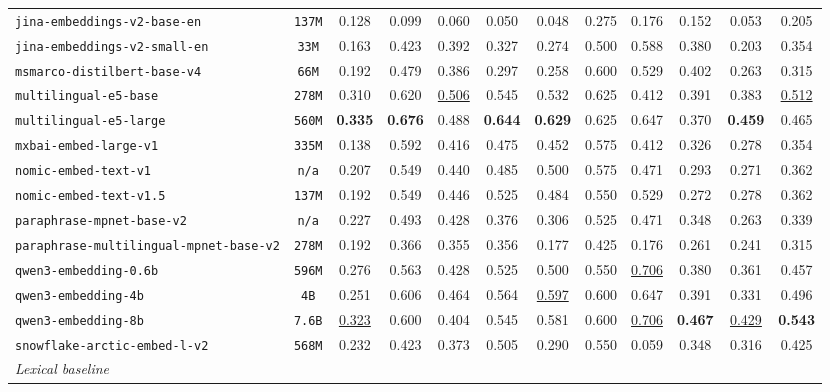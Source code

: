 \documentclass{article}
\begin{document}
\begin{table}[htbp]
{\begin{tabular}{lccccccccccc}
\texttt{jina-embeddings-v2-base-en} & \texttt{137M} & 0.128 & 0.099 & 0.060 & 0.050 & 0.048 & 0.275 & 0.176 & 0.152 & 0.053 & 0.205 \\
\texttt{jina-embeddings-v2-small-en} & \texttt{33M} & 0.163 & 0.423 & 0.392 & 0.327 & 0.274 & 0.500 & 0.588 & 0.380 & 0.203 & 0.354 \\
\texttt{msmarco-distilbert-base-v4} & \texttt{66M} & 0.192 & 0.479 & 0.386 & 0.297 & 0.258 & 0.600 & 0.529 & 0.402 & 0.263 & 0.315 \\
\texttt{multilingual-e5-base} & \texttt{278M} & 0.310 & 0.620 & \underline{0.506} & 0.545 & 0.532 & 0.625 & 0.412 & 0.391 & 0.383 & \underline{0.512} \\
\texttt{multilingual-e5-large} & \texttt{560M} & \textbf{0.335} & \textbf{0.676} & 0.488 & \textbf{0.644} & \textbf{0.629} & 0.625 & 0.647 & 0.370 & \textbf{0.459} & 0.465 \\
\texttt{mxbai-embed-large-v1} & \texttt{335M} & 0.138 & 0.592 & 0.416 & 0.475 & 0.452 & 0.575 & 0.412 & 0.326 & 0.278 & 0.354 \\
\texttt{nomic-embed-text-v1} & \texttt{n/a} & 0.207 & 0.549 & 0.440 & 0.485 & 0.500 & 0.575 & 0.471 & 0.293 & 0.271 & 0.362 \\
\texttt{nomic-embed-text-v1.5} & \texttt{137M} & 0.192 & 0.549 & 0.446 & 0.525 & 0.484 & 0.550 & 0.529 & 0.272 & 0.278 & 0.362 \\
\texttt{paraphrase-mpnet-base-v2} & \texttt{n/a} & 0.227 & 0.493 & 0.428 & 0.376 & 0.306 & 0.525 & 0.471 & 0.348 & 0.263 & 0.339 \\
\texttt{paraphrase-multilingual-mpnet-base-v2} & \texttt{278M} & 0.192 & 0.366 & 0.355 & 0.356 & 0.177 & 0.425 & 0.176 & 0.261 & 0.241 & 0.315 \\
\texttt{qwen3-embedding-0.6b} & \texttt{596M} & 0.276 & 0.563 & 0.428 & 0.525 & 0.500 & 0.550 & \underline{0.706} & 0.380 & 0.361 & 0.457 \\
\texttt{qwen3-embedding-4b} & \texttt{4B} & 0.251 & 0.606 & 0.464 & 0.564 & \underline{0.597} & 0.600 & 0.647 & 0.391 & 0.331 & 0.496 \\
\texttt{qwen3-embedding-8b} & \texttt{7.6B} & \underline{0.323} & 0.600 & 0.404 & 0.545 & 0.581 & 0.600 & \underline{0.706} & \textbf{0.467} & \underline{0.429} & \textbf{0.543} \\
\texttt{snowflake-arctic-embed-l-v2} & \texttt{568M} & 0.232 & 0.423 & 0.373 & 0.505 & 0.290 & 0.550 & 0.059 & 0.348 & 0.316 & 0.425 \\
\midrule
\multicolumn{12}{l}{\textit{Lexical baseline}} \\

\end{tabular}}
\end{table}
\end{document}
